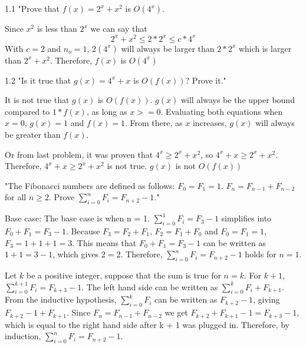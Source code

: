 \documentclass{article}
\author{Joshua Harthan}
\begin{document}
\item 1.1 "Prove that $f(x) = 2^x + x^2$ is $O(4^x)$. 

\item Since $x^2$ is less than $2^x$ we can say that $$2^x + x^2 \leq 2 * 2^x \leq c*4^x$$
With $c = 2$ and $n_o = 1$, $2(4^x)$ will always be larger than $2*2^x$ which is larger than $2^x + x^2$. Therefore, $f(x)$ is $O(4^x)$



\item 1.2 "Is it true that $g(x) = 4^x + x$ is $O(f(x))$? Prove it."

\item It is not true that $g(x)$ is $O(f(x))$. $g(x)$ will always be the upper bound compared to $1*f(x)$, as long as $x >= 0$. Evaluating both equations when $x = 0$, $g(x) = 1$ and $f(x) = 1$. From there, as $x$ increases, $g(x)$ will always be greater than $f(x)$. 

Or from last problem, it was proven that $4^x \geq 2^x + x^2$, so $4^x + x \geq 2^x + x^2$. Therefore, $4^x + x \geq 2^x + x^2$ is not true. $g(x)$ is not $O(f(x))$



\clearpage
\header

\item "The Fibonacci numbers are defined as follows: $F_0=F_1=1$. $F_n=F_{n-1} + F_{n-2}$ for all $n \geq 2$. Prove $\sum_{i=0}^n F_i = F_{n+2}-1$."

\item Base case: The base case is when n = 1. $\sum_{i=0}^1 F_i = F_3 - 1$ simplifies into $F_0 + F_1 = F_3 - 1$. Because $F_3=F_{2} + F_{1}$, $F_2 = F_1+ F_0$ and $F_0=F_1 = 1$, $F_3 = 1 + 1 + 1 = 3$. This means that $F_0 + F_1 = F_3 - 1$ can be written as $1 + 1 = 3 - 1$, which gives $2=2$. Therefore, $\sum_{i=0}^n F_i = F_{n+2}-1$ holds for $n = 1$.
\item Let $k$ be a positive integer, suppose that the sum is true for $n = k$. For $k + 1$, $\sum_{i=0}^{k+1} F_i = F_{k+3} - 1$. The left hand side can be written as $\sum_{i=0}^k F_i + F_{k+1}$. From the inductive hypothesis, $\sum_{i=0}^k F_i$ can be written as $F_{k+2}-1$, giving $F_{k+2} - 1 + F_{k+1}$. Since $F_n=F_{n-1} + F_{n-2}$ we get $F_{k+2} + F_{k+1} - 1 = F_{k+3} - 1$, which is equal to the right hand side after k + 1 was plugged in. Therefore, by induction, $\sum_{i=0}^n F_i = F_{n+2}-1$.
\end{document}
